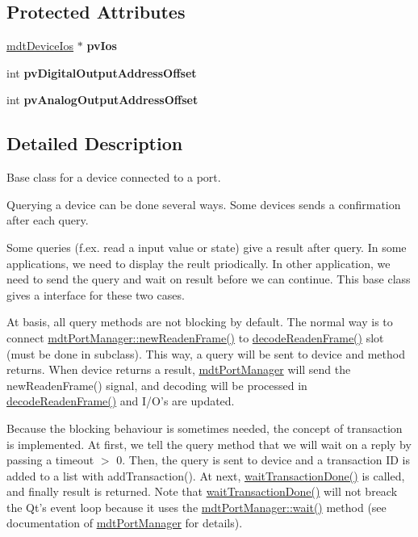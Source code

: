 \subsection*{Protected Attributes}
\begin{DoxyCompactItemize}
\item 
\hypertarget{classmdt_device_aa84e01b13f98fc35476a2654f1c8d2b3}{
\hyperlink{classmdt_device_ios}{mdtDeviceIos} $\ast$ {\bfseries pvIos}}
\label{classmdt_device_aa84e01b13f98fc35476a2654f1c8d2b3}

\item 
\hypertarget{classmdt_device_a7578dfa3df390d20b1bdce1319d45dbc}{
int {\bfseries pvDigitalOutputAddressOffset}}
\label{classmdt_device_a7578dfa3df390d20b1bdce1319d45dbc}

\item 
\hypertarget{classmdt_device_a50a6824fe8b9ae2a7e7c56b8e0686a76}{
int {\bfseries pvAnalogOutputAddressOffset}}
\label{classmdt_device_a50a6824fe8b9ae2a7e7c56b8e0686a76}

\end{DoxyCompactItemize}


\subsection{Detailed Description}
Base class for a device connected to a port. 

Querying a device can be done several ways. Some devices sends a confirmation after each query.

Some queries (f.ex. read a input value or state) give a result after query. In some applications, we need to display the reult priodically. In other application, we need to send the query and wait on result before we can continue. This base class gives a interface for these two cases.

At basis, all query methods are not blocking by default. The normal way is to connect \hyperlink{classmdt_port_manager_a77ef4a432306638f5b0f91df7863ac62}{mdtPortManager::newReadenFrame()} to \hyperlink{classmdt_device_a5556423c2e2b3a3adcca5d4efb5af04e}{decodeReadenFrame()} slot (must be done in subclass). This way, a query will be sent to device and method returns. When device returns a result, \hyperlink{classmdt_port_manager}{mdtPortManager} will send the newReadenFrame() signal, and decoding will be processed in \hyperlink{classmdt_device_a5556423c2e2b3a3adcca5d4efb5af04e}{decodeReadenFrame()} and I/O's are updated.

Because the blocking behaviour is sometimes needed, the concept of transaction is implemented. At first, we tell the query method that we will wait on a reply by passing a timeout $>$ 0. Then, the query is sent to device and a transaction ID is added to a list with addTransaction(). At next, \hyperlink{classmdt_device_a1df875803a3a0eb7324047d33c139621}{waitTransactionDone()} is called, and finally result is returned. Note that \hyperlink{classmdt_device_a1df875803a3a0eb7324047d33c139621}{waitTransactionDone()} will not breack the Qt's event loop because it uses the \hyperlink{classmdt_port_manager_acc5c63ad33fdd3cc153fc23e00c6e69c}{mdtPortManager::wait()} method (see documentation of \hyperlink{classmdt_port_manager}{mdtPortManager} for details).

